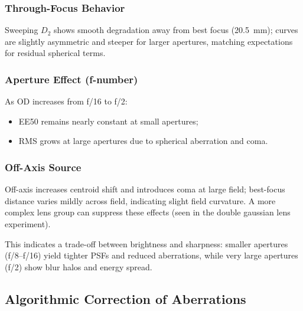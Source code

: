 \documentclass[11pt,a4paper]{article}
\begin{document}
		
	\subsubsection*{Through-Focus Behavior}
	
	Sweeping \(D_2\) shows smooth degradation away from best focus (\SI{20.5}{mm}); curves are slightly asymmetric and steeper for larger apertures, matching expectations for residual spherical terms.
	
	\subsubsection*{Aperture Effect (f-number)}
	
	As OD increases from f/16 to f/2:
	\begin{itemize}
		\item 	EE50 remains nearly constant at small apertures;
		\item 	RMS grows at large apertures due to spherical aberration and coma.
	\end{itemize}

	\subsubsection*{Off-Axis Source}

Off-axis increases centroid shift and introduces coma at large field; best-focus distance varies mildly across field, indicating slight field curvature.
A more complex lens group can suppress these effects (seen in the double gaussian lens experiment).

This indicates a trade-off between brightness and sharpness:
smaller apertures (f/8–f/16) yield tighter PSFs and reduced aberrations,
while very large apertures (f/2) show blur halos and energy spread.


	
	\subsection{Algorithmic Correction of Aberrations}
	
\end{document}
